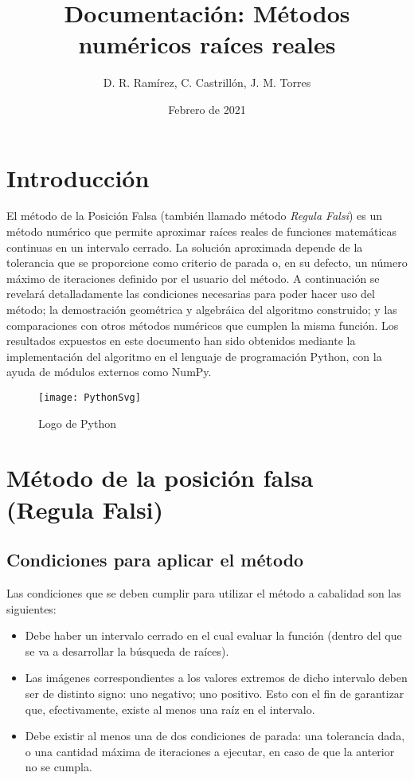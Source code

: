 \documentclass{article}
\title{Documentación: Métodos numéricos raíces reales}
\author{D. R. Ramírez, C. Castrillón, J. M. Torres}
\date{Febrero de 2021}
\begin{document}
\maketitle

\section{Introducción}
El método de la Posición Falsa (también llamado método \emph{Regula Falsi}) es un método numérico que permite aproximar raíces reales de funciones matemáticas continuas en un intervalo cerrado. La solución aproximada depende de la tolerancia que se proporcione como criterio de parada o, en su defecto, un número máximo de iteraciones definido por el usuario del método. A continuación se revelará detalladamente las condiciones necesarias para poder hacer uso del método; la demostración geométrica y algebráica del algoritmo construido; y las comparaciones con otros métodos numéricos que cumplen la misma función. Los resultados expuestos en este documento han sido obtenidos mediante la implementación del algoritmo en el lenguaje de programación Python, con la ayuda de módulos externos como NumPy.
\begin{figure}[H]
    \centering
    \texttt{[image: PythonSvg]}
    \caption{Logo de Python}
    \label{fig:PythonSvg}
\end{figure}
\section{Método de la posición falsa (Regula Falsi)}
\subsection{Condiciones para aplicar el método}
Las condiciones que se deben cumplir para utilizar el método a cabalidad son las siguientes:

\begin{itemize}
    \item Debe haber un intervalo cerrado en el cual evaluar la función (dentro del que se va a desarrollar la búsqueda de raíces).
    \item Las imágenes correspondientes a los valores extremos de dicho intervalo deben ser de distinto signo: uno negativo; uno positivo. Esto con el fin de garantizar que, efectivamente, existe al menos una raíz en el intervalo.
    \item Debe existir al menos una de dos condiciones de parada: una tolerancia dada, o una cantidad máxima de iteraciones a ejecutar, en caso de que la anterior no se cumpla.
\end{itemize}
\end{document}
